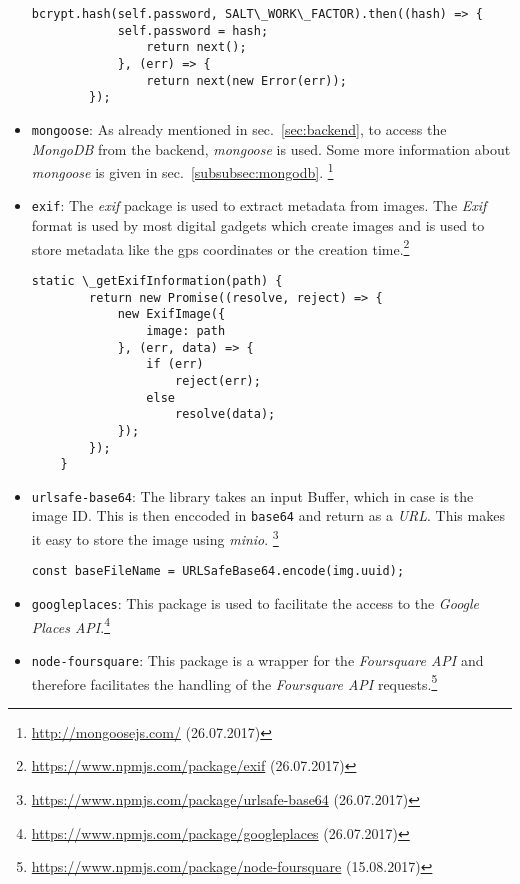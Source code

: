 \begin{itemize}
\begin{lstlisting}[caption={\textit{bcrypt} for hashing the users password.}, label=lst:bcrypt]
		bcrypt.hash(self.password, SALT\_WORK\_FACTOR).then((hash) => {
			self.password = hash;
				return next();
			}, (err) => {
				return next(new Error(err));
		});
	\end{lstlisting}
	\item \texttt{mongoose}: As already mentioned in sec.\ \ref{sec:backend}, to access the \textit{MongoDB} from the backend, \textit{mongoose} is used. Some more information about \textit{mongoose} is given in sec.\ \ref{subsubsec:mongodb}. 
	\footnote{\url{http://mongoosejs.com/} (26.07.2017)}
	\item \texttt{exif}: The \textit{exif} package is used to extract metadata from images. The \textit{Exif} format is used by most digital gadgets which create images and is used to store metadata like the gps coordinates or the creation time.\footnote{\url{https://www.npmjs.com/package/exif} (26.07.2017)}
	\begin{lstlisting}[caption={Extraction of \textit{Exif} metadata from an image.}, label=lst:exif]
	static \_getExifInformation(path) {
		return new Promise((resolve, reject) => {
			new ExifImage({
				image: path
			}, (err, data) => {
				if (err)
					reject(err);
				else
					resolve(data);
			});
		});
	}
	\end{lstlisting}	
	\item \texttt{urlsafe-base64}: The library takes an input Buffer, which in case is the image ID. This is then enccoded in \texttt{base64} and return as a \textit{URL}. This makes it easy to store the image using \textit{minio}.
	\footnote{\url{https://www.npmjs.com/package/urlsafe-base64} (26.07.2017)}
	\begin{lstlisting}[caption={This package enables encoding an ID created with \texttt{uuid} in \texttt{base64} as a \textit{URL}. This name then can further be used to save the image with \texttt{minio}.}, label=lst:urlsafe-base64]
	const baseFileName = URLSafeBase64.encode(img.uuid);
	\end{lstlisting}
	\item \texttt{googleplaces}: This package is used to facilitate the access to the \textit{Google Places API}.\footnote{\url{https://www.npmjs.com/package/googleplaces} (26.07.2017)}
	\item \texttt{node-foursquare}: This package is a wrapper for the \textit{Foursquare API} and therefore facilitates the handling of the \textit{Foursquare API} requests.\footnote{\url{https://www.npmjs.com/package/node-foursquare} (15.08.2017)} 

\end{itemize}
